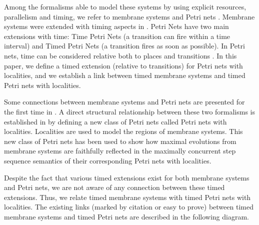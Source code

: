 \documentclass{eptcs}
\begin{document}
Among the formalisms able to model these systems by using explicit
resources, parallelism and timing, we refer to membrane systems
\cite{Paun02} and Petri nets \cite{Jensen92,Peterson81}. Membrane
systems were extended with timing aspects in
\cite{Cavaliere05,Cavaliere10}. Petri Nets have two main extensions
with time: Time Petri Nets \cite{Merlin74} (a transition can fire
within a time interval) and Timed Petri Nets \cite{Ramchandani74} (a
transition fires as soon as possible). In Petri nets, time
can be considered relative both to places and transitions
\cite{Pezze99,Sifakis80}. In this paper, we define a timed extension
(relative to transitions) for Petri nets with localities, and we
establish a link between timed membrane systems and timed Petri nets
with localities.

Some connections between membrane systems and Petri nets are presented for the
first time in \cite{Zilio04,Qi04}. A direct structural relationship between
these two formalisms is established in \cite{Kleijn10,Kleijn06} by defining a
new class of Petri nets called Petri nets with localities. Localities are used
to model the regions of membrane systems. This new class of Petri
nets has been used to show how maximal evolutions from membrane systems are
faithfully reflected in the maximally concurrent step sequence semantics of
their corresponding Petri nets with localities.

Despite the fact that various timed extensions exist for both
membrane systems and Petri nets, we are not aware of any connection
between these timed extensions. Thus, we relate timed membrane
systems with timed Petri nets with localities. The existing links
(marked by citation or easy to prove) between timed membrane systems
and timed Petri nets are described in the following diagram.

\medskip

\begin{center}
\end{center}
\end{document}
